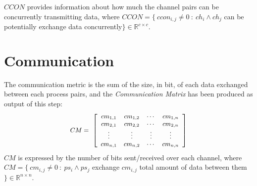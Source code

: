 %
$CCON$ provides information about how much the channel pairs can be concurrently transmitting data, where $CCON = \{ \ ccon_{i,j} \neq 0 \ : \ ch_{i} \land ch_{j}$ can be potentially exchange data concurrently$\} \in \mathbb{R}^{c \times c}$. \par
%
\section{Communication}\label{comm_con_metric_eval_only_comm}
%
The communication metric is the sum of the size, in bit, of each data exchanged between each process pairs, and the \textit{Communication Matrix} has been produced as output of this step:
%
\begin{equation} \label{eq8}
\small
\begin{aligned}
{CM}=\ \left[  
\begin{array}{cccc}
{cm}_{1,1} & {cm}_{1,2} & \cdots  & {cm}_{1,n} \\ 
{cm}_{2,1} & {cm}_{2,2} & \cdots  & {cm}_{2,n} \\ 
\vdots      & \vdots      & \vdots  & \vdots  \\ 
{cm}_{n,1} & {cm}_{n,2} & \cdots  & {cm}_{n,n} 
\end{array}
\right]   \\ 
\end{aligned}
\end{equation}
%
$CM$ is expressed by the number of bits sent/received over each channel, where $CM = \{ \ cm_{i,j} \neq 0 \ : \ ps_{i} \land ps_{j}$ exchange $cm_{i,j}$ total amount of data between them$\} \in \mathbb{R}^{n \times n}$. 
%
